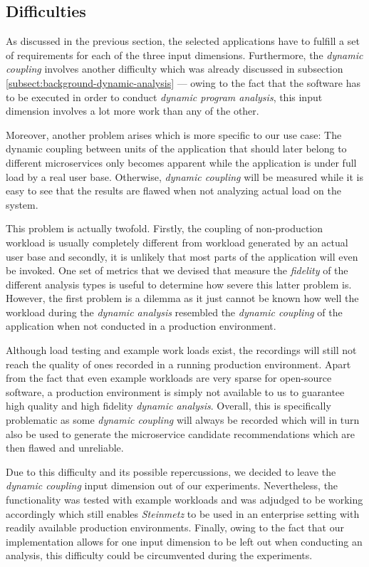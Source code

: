 \documentclass[12pt,a4paper]{report}
\begin{document}
\subsection{Difficulties} \label{subsect:difficulties}

As discussed in the previous section, the selected applications have to fulfill
a set of requirements for each of the three input dimensions.
Furthermore, the \textit{dynamic coupling} involves another difficulty which
was already discussed in subsection \ref{subsect:background-dynamic-analysis} ---
owing to the fact that the software has to be executed in order to conduct
\textit{dynamic program analysis}, this input dimension involves a lot more work
than any of the other.

Moreover, another problem arises which is more specific to
our use case: The dynamic coupling between units of the application that should
later belong to different microservices only becomes apparent while the application
is under full load by a real user base.
Otherwise, \textit{dynamic coupling} will be measured while it is easy to see
that the results are flawed when not analyzing actual load on the system.

This problem is actually twofold. Firstly, the coupling of non-production workload
is usually completely different from workload generated by an actual user base and
secondly, it is unlikely that most parts of the application will even be invoked.
One set of metrics that we devised that measure the \textit{fidelity} of the
different analysis types is useful to determine how severe this latter problem is.
However, the first problem is a dilemma as it just cannot be known how well the
workload during the \textit{dynamic analysis} resembled the \textit{dynamic coupling}
of the application when not conducted in a production environment.

Although load testing and example work loads exist, the recordings will still
not reach the quality of ones recorded in a running production environment.
Apart from the fact that even example workloads are very sparse for open-source
software, a production environment is simply not available to us to guarantee
high quality and high fidelity \textit{dynamic analysis}.
Overall, this is specifically problematic as some \textit{dynamic coupling} will always
be recorded which will in turn also be used to generate the microservice candidate
recommendations which are then flawed and unreliable.

Due to this difficulty and its possible repercussions, we decided to leave the
\textit{dynamic coupling} input dimension out of our experiments.
Nevertheless, the functionality was tested with example workloads and was adjudged
to be working accordingly which still enables \textit{Steinmetz} to be used
in an enterprise setting with readily available production environments.
Finally, owing to the fact that our implementation allows for one input dimension
to be left out when conducting an analysis, this difficulty could be circumvented
during the experiments.
\end{document}
